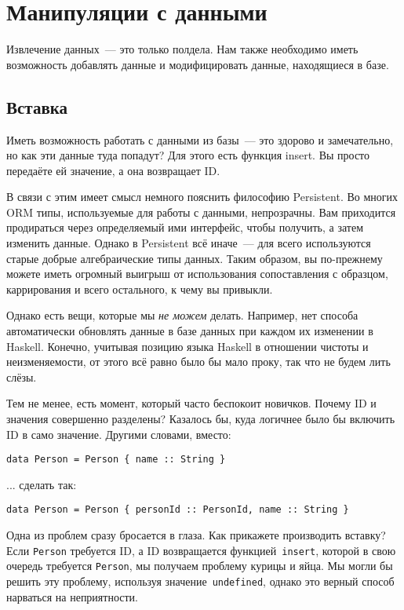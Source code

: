 \section{Манипуляции с данными}

Извлечение данных~--- это только полдела. Нам также необходимо иметь
возможность добавлять данные и модифицировать данные, находящиеся в базе.

\subsection{Вставка}

Иметь возможность работать с данными из базы~--- это здорово и замечательно, но
как эти данные туда попадут? Для этого есть функция insert. Вы просто передаёте
ей значение, а она возвращает ID.

В связи с этим имеет смысл немного пояснить философию Persistent. Во многих ORM
типы, используемые для работы с данными, непрозрачны. Вам приходится
продираться через определяемый ими интерфейс, чтобы получить, а затем изменить
данные. Однако в Persistent всё иначе~--- для всего используются старые добрые
алгебраические типы данных. Таким образом, вы по-прежнему можете иметь огромный
выигрыш от использования сопоставления с образцом, каррирования и всего
остального, к чему вы привыкли.

Однако есть вещи, которые мы \emph{не можем} делать. Например, нет способа
автоматически обновлять данные в базе данных при каждом их изменении в Haskell.
Конечно, учитывая позицию языка Haskell в отношении чистоты и неизменяемости,
от этого всё равно было бы мало проку, так что не будем лить слёзы.

Тем не менее, есть момент, который часто беспокоит новичков. Почему ID и
значения совершенно разделены? Казалось бы, куда логичнее было бы включить ID в
само значение. Другими словами, вместо:

\begin{lstlisting}
data Person = Person { name :: String }
\end{lstlisting}

... сделать так:

\begin{lstlisting}
data Person = Person { personId :: PersonId, name :: String }
\end{lstlisting}

Одна из проблем сразу бросается в глаза. Как прикажете производить вставку?
Если \lstinline'Person' требуется ID, а ID возвращается
функцией~\lstinline'insert', которой в свою очередь требуется
\lstinline'Person', мы получаем проблему курицы и яйца. Мы могли бы решить эту
проблему, используя значение~\lstinline'undefined', однако это верный способ
нарваться на неприятности.

